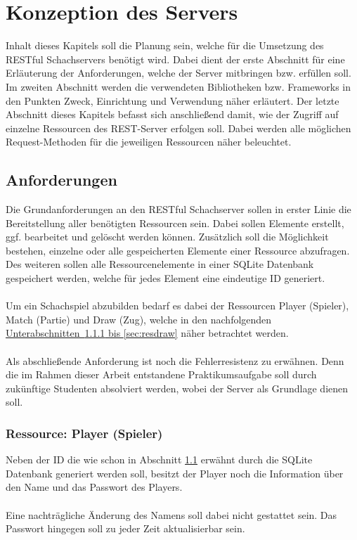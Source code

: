 
\chapter{Konzeption des Servers}
Inhalt dieses Kapitels soll die Planung sein, welche für die Umsetzung des RESTful Schachservers benötigt wird. Dabei dient der erste Abschnitt für eine Erläuterung der Anforderungen, welche der Server mitbringen bzw. erfüllen soll. Im zweiten Abschnitt werden die verwendeten Bibliotheken bzw. Frameworks in den Punkten Zweck, Einrichtung und Verwendung näher erläutert. Der letzte Abschnitt dieses Kapitels befasst sich anschließend damit, wie der Zugriff auf einzelne Ressourcen des REST-Server erfolgen soll. Dabei werden alle möglichen Request-Methoden für die jeweiligen Ressourcen näher beleuchtet.

\section{Anforderungen}\label{sec:anforderungen}
Die Grundanforderungen an den RESTful Schachserver sollen in erster Linie die Bereitstellung aller benötigten Ressourcen sein. Dabei sollen Elemente erstellt, ggf. bearbeitet und gelöscht werden können. Zusätzlich soll die Möglichkeit bestehen, einzelne oder alle gespeicherten Elemente einer Ressource abzufragen. Des weiteren sollen alle Ressourcenelemente in einer SQLite Datenbank gespeichert werden, welche für jedes Element eine eindeutige ID generiert.\\
\\
Um ein Schachspiel abzubilden bedarf es dabei der Ressourcen Player (Spieler), Match (Partie) und Draw (Zug), welche in den nachfolgenden \hyperref[sec:resplayer, sec:resdraw]{Unterabschnitten~\ref{sec:resplayer} bis \ref{sec:resdraw}} näher betrachtet werden.\\
\\
Als abschließende Anforderung ist noch die Fehlerresistenz zu erwähnen. Denn die im Rahmen dieser Arbeit entstandene Praktikumsaufgabe  soll durch zukünftige Studenten absolviert werden, wobei der Server als Grundlage dienen soll.

\subsection{Ressource: Player (Spieler)}\label{sec:resplayer}
Neben der ID die wie schon in Abschnitt \ref{sec:anforderungen} erwähnt durch die SQLite Datenbank generiert werden soll, besitzt der Player noch die Information über den Name und das Passwort des Players.\\
\\
Eine nachträgliche Änderung des Namens soll dabei nicht gestattet sein. Das Passwort hingegen soll zu jeder Zeit aktualisierbar sein.

